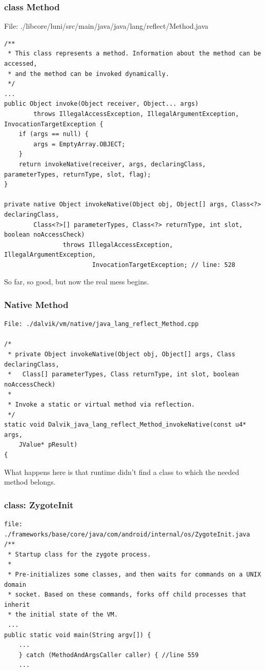 \documentclass[11pt,a4paper]{beamer}
\begin{document}
\begin{frame}[fragile]
\frametitle{class Method}
File: ./libcore/luni/src/main/java/java/lang/reflect/Method.java

\tiny
\begin{verbatim}
/**
 * This class represents a method. Information about the method can be accessed,
 * and the method can be invoked dynamically.
 */
...
public Object invoke(Object receiver, Object... args)
        throws IllegalAccessException, IllegalArgumentException, InvocationTargetException {
    if (args == null) {
        args = EmptyArray.OBJECT;
    }
    return invokeNative(receiver, args, declaringClass, parameterTypes, returnType, slot, flag);
}

private native Object invokeNative(Object obj, Object[] args, Class<?> declaringClass,
        Class<?>[] parameterTypes, Class<?> returnType, int slot, boolean noAccessCheck)
                throws IllegalAccessException, IllegalArgumentException,
                        InvocationTargetException; // line: 528
\end{verbatim}
\normalsize

So far, so good, but now the real mess begins.
\end{frame}


\begin{frame}[fragile]
\frametitle{Native Method}

\scriptsize
\begin{verbatim}
File: ./dalvik/vm/native/java_lang_reflect_Method.cpp

/*
 * private Object invokeNative(Object obj, Object[] args, Class declaringClass,
 *   Class[] parameterTypes, Class returnType, int slot, boolean noAccessCheck)
 *
 * Invoke a static or virtual method via reflection.
 */
static void Dalvik_java_lang_reflect_Method_invokeNative(const u4* args,
    JValue* pResult)
{
\end{verbatim}
\normalsize

What happens here is that runtime didn't find a class to which the needed method belongs. 

\end{frame}

\begin{frame}[fragile]
\frametitle{class: ZygoteInit}
\scriptsize
\begin{verbatim}
file: ./frameworks/base/core/java/com/android/internal/os/ZygoteInit.java
/**
 * Startup class for the zygote process.
 *
 * Pre-initializes some classes, and then waits for commands on a UNIX domain
 * socket. Based on these commands, forks off child processes that inherit
 * the initial state of the VM.
 ...
public static void main(String argv[]) {
    ...
    } catch (MethodAndArgsCaller caller) { //line 559
	...
	
\end{verbatim}
\normalsize
\end{frame}
\end{document}
